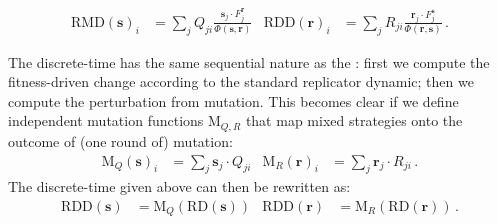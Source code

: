 \documentclass[fleqn,reqno,10pt]{article}
\renewcommand{\Smixed}{\ensuremath{\mathrm{\mathbf{s}}}}
\renewcommand{\Rmixed}{\ensuremath{\mathrm{\mathbf{r}}}}
\newcommand{\rmd}{\acro{rmd}} %
\newcommand{\rdd}{\acro{rdd}} %
\newcommand{\RD}{\ensuremath{\mathrm{RD}}} %
\newcommand{\RDD}{\ensuremath{\mathrm{RDD}}} %
\newcommand{\RMD}{\ensuremath{\mathrm{RMD}}} %
\newcommand{\Mutate}{\ensuremath{\mathrm{M}}} %
\begin{document}
\begin{align*}
  \RMD(\Smixed)_i & = \sum_{j} Q_{ji} \frac{\Smixed_j \cdot
    F_j^{\Rmixed}}{ \Phi(\Smixed,\Rmixed)} & \RDD(\Rmixed)_i & =
  \sum_{j} R_{ji} \frac{\Rmixed_j \cdot F_j^{\Smixed}}{
    \Phi(\Rmixed,\Smixed)}\,.
\end{align*}


The discrete-time \rmd has the same sequential nature as the \rdd:
first we compute the fitness-driven change according to the standard
replicator dynamic; then we compute the perturbation from
mutation. This becomes clear if we define independent mutation
functions $\Mutate_{Q,R}$ that map mixed strategies onto the outcome
of (one round of) mutation:
\begin{align}
  \label{eq:Mutation}
  \Mutate_Q(\Smixed)_i & =  \sum_j  \Smixed_j \cdot
  Q_{ji} &   \Mutate_R(\Rmixed)_i & =  \sum_{j}  \Rmixed_j \cdot
  R_{ji} \,.
\end{align}
The discrete-time \rmd given above can then be rewritten as:
\begin{align*}
  \RDD(\Smixed) &= \Mutate_Q(\RD(\Smixed)) &   \RDD(\Rmixed) &= \Mutate_R(\RD(\Rmixed))\,. 
\end{align*}
\end{document}
